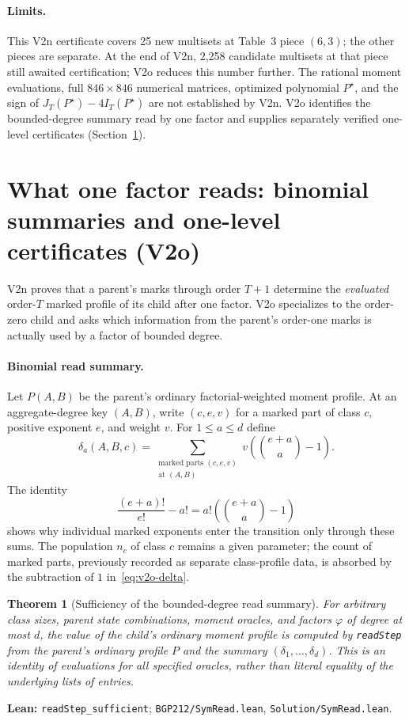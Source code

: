 \documentclass[11pt]{article}
\newtheorem{theorem}{Theorem}[section]
\newcommand{\code}[1]{\texttt{#1}}
\begin{document}
\paragraph{Limits.}
This V2n certificate covers 25 new multisets at Table~3 piece $(6,3)$;
the other pieces are separate. At the end of V2n, 2,258 candidate
multisets at that piece still awaited certification; V2o reduces this number further.
The rational moment evaluations, full $846\times846$ numerical
matrices, optimized polynomial $P^\star$, and the sign of
$J_T(P^\star)-4I_T(P^\star)$ are not established by V2n.
V2o identifies the bounded-degree summary read by one factor and supplies
separately verified one-level certificates (Section~\ref{sec:v2o}).


\section{What one factor reads: binomial summaries and one-level certificates (V2o)}\label{sec:v2o}
V2n proves that a parent's marks through order $T+1$ determine the
\emph{evaluated} order-$T$ marked profile of its child after one factor.
V2o specializes to the order-zero child and asks which information from the
parent's order-one marks is actually used by a factor of bounded degree.

\paragraph{Binomial read summary.}
Let $P(A,B)$ be the parent's ordinary factorial-weighted moment profile.
At an aggregate-degree key $(A,B)$, write $(c,e,v)$ for a marked part of
class $c$, positive exponent $e$, and weight $v$. For $1\le a\le d$ define
\begin{equation}\label{eq:v2o-delta}
 \delta_a(A,B,c)
 =\sum_{\substack{\text{marked parts }(c,e,v)\\\text{at }(A,B)}}
   v\left(\binom{e+a}{a}-1\right).
\end{equation}
The identity
\begin{equation}\label{eq:v2o-binomial}
 \frac{(e+a)!}{e!}-a!
 =a!\left(\binom{e+a}{a}-1\right)
\end{equation}
shows why individual marked exponents enter the transition only through
these sums. The population $n_c$ of class $c$ remains a given parameter;
the count of marked parts, previously recorded as separate class-profile
data, is absorbed by the subtraction of $1$ in~\eqref{eq:v2o-delta}.

\begin{theorem}[Sufficiency of the bounded-degree read summary]\label{thm:v2o-sufficient}
For arbitrary class sizes, parent state combinations, moment oracles, and
factors $\varphi$ of degree at most $d$, the \emph{value} of the child's
ordinary moment profile is computed by \code{readStep} from the parent's
ordinary profile $P$ and the summary $(\delta_1,\ldots,\delta_d)$.
This is an identity of evaluations for all specified oracles, rather than
literal equality of the underlying lists of entries.
\end{theorem}
\noindent\textbf{Lean:} \code{readStep\_sufficient};
\nolinkurl{BGP212/SymRead.lean}, \nolinkurl{Solution/SymRead.lean}.
\end{document}
